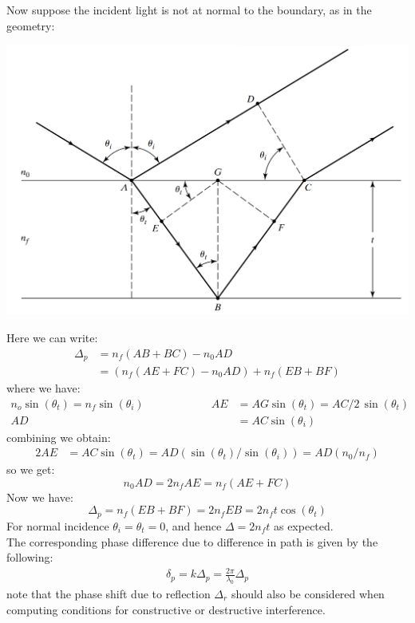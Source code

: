 \documentclass[11pt]{book}
\theoremstyle{break}
\theoremstyle{break}
\begin{document}
Now suppose the incident light is not at normal to the boundary, as in the geometry:
\begin{center}
\includegraphics[scale=0.45]{tiltedFilm.png}
\end{center}
Here we can write:
\begin{align*}
\Delta_p &= n_f(AB+BC)-n_0 AD \\
&= \left( n_f(AE+FC) -n_0 AD\right) + n_f(EB+BF)
\end{align*}
where we have:
\begin{align*}
n_o \sin(\theta_t) = n_f \sin(\theta_i) \qquad\qquad\qquad
AE &= AG \sin(\theta_t) = AC/2 \, \sin(\theta_t)\\
AD &= AC \sin(\theta_i)
\end{align*}
combining we obtain:
\begin{align*}
2AE &= AC\sin(\theta_t) = AD (\sin(\theta_t) / \sin(\theta_i)) =AD (n_0 / n_f)
\end{align*}
so we get:
$$
n_0 AD = 2n_f AE = n_f(AE+FC)$$
Now we have: 
$$\Delta_p = n_f(EB+BF) = 2n_f EB = 2n_f t\cos(\theta_t)$$
For normal incidence $\theta_i = \theta_t = 0$, and hence $\Delta = 2n_f t$ as expected. \\
The corresponding phase difference due to difference in path is given by the following:
\begin{align*}
\delta_p = k\Delta_p = \frac{2\pi}{\lambda_0}\Delta_p
\end{align*}
note that the phase shift due to reflection $\Delta_r$ should also be considered when computing conditions for constructive or destructive interference. \\
\end{document}
